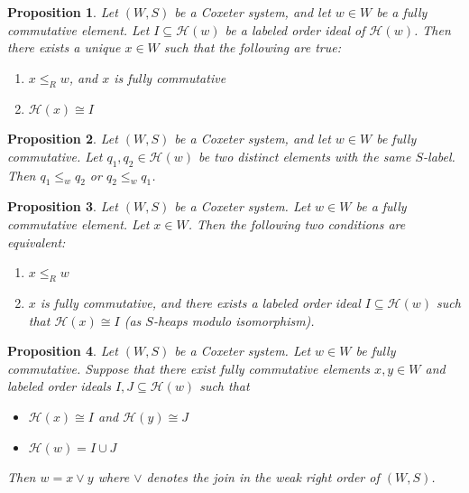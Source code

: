 \documentclass[10pt,a4paper]{amsart}
\newtheorem{prop}{Proposition}
\def\H#1{\mathcal{H}(#1)}
\def\weakr{\leq_{R}}
\begin{document}
\begin{prop} \label{existscorrprop}
    Let $ (W,S )$ be a Coxeter system, and let $ w\in W$ be a fully commutative element. Let $I \subseteq \H{w}$ be a labeled order ideal of $ \H{w}$. Then there exists a unique $ x\in W$ such that the following are true:

    \begin{enumerate}
        \item $ x \weakr w$, and $ x$ is fully commutative

        \item $ \H{x} \cong I$
    \end{enumerate}
\end{prop}

\begin{prop} \label{mustbecompprop}
    Let $ (W,S)$ be a Coxeter system, and let $ w\in W$ be fully commutative. Let $ q_{1}, q_{2} \in \H{w}$ be two distinct elements with the same $S$-label. Then $ q_{1} \leq_{w} q_{2}$ or $ q_{2} \leq_{w} q_{1}$.
\end{prop}

\begin{prop} \label{equividealprop}
    Let $ (W,S)$ be a Coxeter system. Let $ w\in W$ be a fully commutative element. Let $x\in W $. Then the following two conditions are equivalent:

    \begin{enumerate}
        \item $ x \weakr w$

        \item $ x$ is fully commutative, and there exists a labeled order ideal $ I \subseteq \H{w}$ such that $ \H{x} \cong I$ (as $S$-heaps modulo isomorphism).
    \end{enumerate}
\end{prop}

\begin{prop} \label{joinidealprop}
    Let $ (W,S)$ be a Coxeter system. Let $ w\in W$ be fully commutative. Suppose that there exist fully commutative elements $ x,y \in W$ and labeled order ideals $ I , J \subseteq \H{w}$ such that

    \begin{itemize}
        \item $ \H{x} \cong I$ and $ \H{y} \cong J$

        \item $ \H{w} = I \cup J$
    \end{itemize}
    Then $ w = x \vee y$ where $ \vee $ denotes the join in the weak right order of $(W,S)$.
\end{prop}
\end{document}
